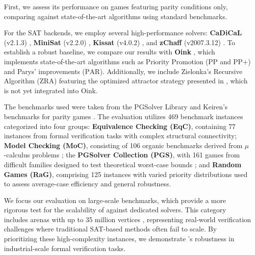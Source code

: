 \documentclass[a4paper,UKenglish,cleveref, autoref, thm-restate, anonymous]{lipics-v2021}
\begin{document}
First, we assess its performance on games featuring parity conditions only, comparing \nocq against state-of-the-art algorithms using standard benchmarks.

For the SAT backends, we employ several high-performance solvers: \textbf{CaDiCaL} (v2.1.3) \cite{Biere:Cadical:2024}, \textbf{MiniSat} (v2.2.0) \cite{Een:MiniSat:2003}, \textbf{Kissat} (v4.0.2) \cite{Biere:Kissat:2024}, and \textbf{zChaff} (v2007.3.12) \cite{Moskewicz:zChaff:2001}. To establish a robust baseline, we compare our results with \textbf{Oink} \cite{vanDijk:2018}, which implements state-of-the-art algorithms such as Priority Promotion ($\text{PP}$ and $\text{PP+}$) and Parys' improvements ($\text{PAR}$). Additionally, we include Zielonka's Recursive Algorithm ($\text{ZRA}$) featuring the optimized attractor strategy presented in \cite{Aggarwal:2023}, which is not yet integrated into Oink.

The benchmarks used were taken from the PGSolver Library \cite{Friedmann:2017} and Keiren's benchmarks for parity games \cite{Keiren:2015}. The evaluation utilizes 469 benchmark instances categorized into four groups: \textbf{Equivalence Checking (EqC)}, containing 77 instances from formal verification tasks with complex structural connectivity; \textbf{Model Checking (MoC)}, consisting of 106 organic benchmarks derived from $\mu$-calculus problems ; the \textbf{PGSolver Collection (PGS)}, with 161 games from difficult families designed to test theoretical worst-case bounds ; and \textbf{Random Games (RaG)}, comprising 125 instances with varied priority distributions used to assess average-case efficiency and general robustness.

We focus our evaluation on large-scale benchmarks, which provide a more rigorous test for the scalability of \nocq against dedicated solvers. This category includes arenas with up to 35 million vertices , representing real-world verification challenges where traditional SAT-based methods often fail to scale. By prioritizing these high-complexity instances, we demonstrate \nocq's robustness in industrial-scale formal verification tasks.
\end{document}
